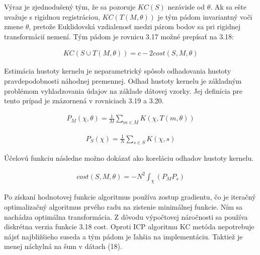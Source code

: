 Výraz je zjednodušený tým, že sa pozoruje $KC\left(S\right)$ nezávisle od $\theta$. Ak sa ešte uvažuje s rigidnou registráciou, $KC\left(T \left(M, \theta \right)\right)$ je tým pádom invariantný voči zmene $\theta$, pretože Euklidovská vzdialenosť medzi párom bodov sa pri rigidnej transformácií nemení. Tým pádom je rovnicu 3.17 možné prepísať na 3.18:

\begin{equation}
\label{eq18}
\begin{aligned}
KC\left(S\cup T\left(M,\theta\right)\right) = c - 2cost\left(S,M,\theta \right)
\end{aligned}
\end{equation}


Estimácia hustoty kernelu je neparametrický spôsob odhadovania hustoty pravdepodobnosti náhodnej premennej. Odhad hustoty kernelu je základným problémom vyhladzovania údajov na základe dátovej vzorky. Jej definícia pre tento prípad je znázornená v rovniciach 3.19 a 3.20.

\begin{equation}
\label{eq19}
\begin{aligned}
P_M\left( \chi,\theta\right)=\frac{1}{M}\sum_{m\in M} K\left(\chi,T\left(m,\theta\right)\right)
\end{aligned}
\end{equation}

\begin{equation}
\label{eq20}
\begin{aligned}
P_S\left( \chi\right)=\frac{1}{N}\sum_{s\in S} K\left(\chi,s\right)
\end{aligned}
\end{equation}

Účelovú funkciu následne možno dokázať ako koreláciu odhadov hustoty kernelu.

\begin{equation}
\label{eq21}
\begin{aligned}
cost\left(S,M,\theta\right)= - N^2 \int_{\chi} \left(P_M P_s\right)
\end{aligned}
\end{equation}

Po získaní hodnotovej funkcie algoritmus používa zostup gradientu, čo je iteračný optimalizačný algoritmus prvého radu na zistenie minimálnej funkcie. Ním sa nachádza optimálna transformácia. Z dôvodu výpočtovej náročnosti sa používa diskrétna verzia funkcie 3.18 cost. Oproti ICP algoritmu KC metóda nepotrebuje nájsť najbližšieho suseda a tým pádom je ľahšia na implementáciu. Taktiež je menej náchylná na šum v dátach (18).

